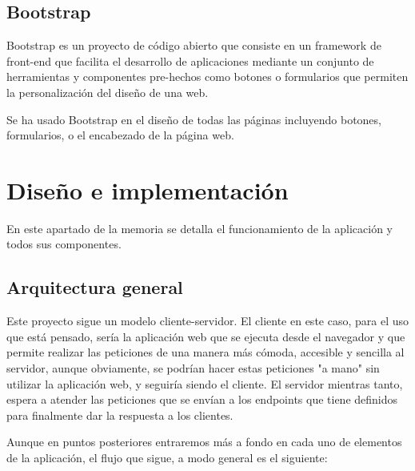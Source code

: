 \documentclass[a4paper, 12pt]{book}
\begin{document}
\section{Bootstrap}
\label{sec:Bootstrap}

Bootstrap es un proyecto de código abierto que consiste en un framework de front-end que facilita el desarrollo de aplicaciones mediante un conjunto de herramientas y componentes pre-hechos como botones o formularios que permiten la personalización del diseño de una web.

Se ha usado Bootstrap en el diseño de todas las páginas incluyendo botones, formularios, o el encabezado de la página web.



\cleardoublepage
\chapter{Diseño e implementación}
\label{sec:diseno}

En este apartado de la memoria se detalla el funcionamiento de la aplicación y todos sus componentes.



\section{Arquitectura general} 
\label{sec:arquitectura}

Este proyecto sigue un modelo cliente-servidor. El cliente en este caso, para el uso que está pensado, sería la aplicación web que se ejecuta desde el navegador y que permite realizar las peticiones de una manera más cómoda, accesible y sencilla al servidor, aunque obviamente, se podrían hacer estas peticiones "a mano" sin utilizar la aplicación web, y seguiría siendo el cliente. El servidor mientras tanto, espera a atender las peticiones que se envían a los endpoints que tiene definidos para finalmente dar la respuesta a los clientes.


Aunque en puntos posteriores entraremos más a fondo en cada uno de elementos de la aplicación, el flujo que sigue, a modo general es el siguiente:
\end{document}
